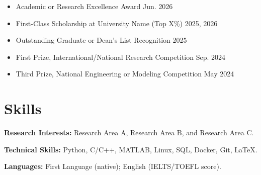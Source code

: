 \documentclass[11pt,a4paper]{article}
\begin{document}
\begin{itemize}[label={\textbullet}, labelindent=0pt, leftmargin=*, labelsep=0.45em,
                topsep=0.15em, itemsep=0pt, parsep=0pt]
    \item Academic or Research Excellence Award \hfill Jun. 2026
    \item First-Class Scholarship at University Name (Top X\%) \hfill 2025, 2026
    \item Outstanding Graduate or Dean's List Recognition \hfill 2025
    \item First Prize, International/National Research Competition \hfill Sep. 2024
    \item Third Prize, National Engineering or Modeling Competition \hfill May 2024
\end{itemize}

\section*{Skills}
\vspace{-0.1em}

\noindent
\textbf{Research Interests:} Research Area A, Research Area B, and Research Area C.

\noindent
\textbf{Technical Skills:} Python, C/C++, MATLAB, Linux, SQL, Docker, Git, \LaTeX.

\noindent
\textbf{Languages:} First Language (native); English (IELTS/TOEFL score).
\end{document}
